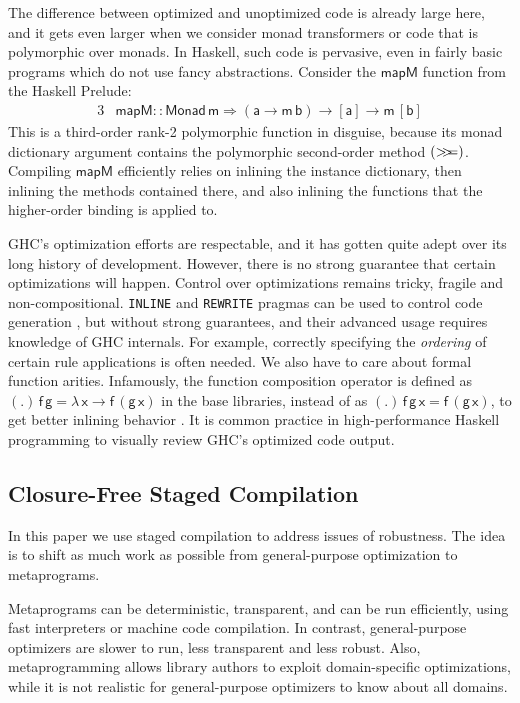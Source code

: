 \documentclass[acmsmall,screen]{acmart}
\newcommand{\msf}[1]{{\mathsf{#1}}}
\newcommand{\lam}{\lambda\,}
\newcommand{\vm}{\mathsf{m}}
\newcommand{\va}{\mathsf{a}}
\newcommand{\vb}{\mathsf{b}}
\newcommand{\vx}{\mathsf{x}}
\newcommand{\vf}{\mathsf{f}}
\newcommand{\vg}{\mathsf{g}}
\newcommand{\Monad}{\msf{Monad}}
\newcommand{\bind}{\mathbin{>\!\!>\mkern-6.7mu=}}
\theoremstyle{remark}
\begin{document}
The difference between optimized and unoptimized code is already large here, and
it gets even larger when we consider monad transformers or code that is
polymorphic over monads. In Haskell, such code is pervasive, even in fairly
basic programs which do not use fancy abstractions. Consider the $\msf{mapM}$
function from the Haskell Prelude:
\begin{alignat*}{3}
  & \msf{mapM} :: \Monad\,\vm \Rightarrow (\va \to \vm\,\vb) \to [\va] \to \vm\,[\vb]
\end{alignat*}
This is a third-order rank-2 polymorphic function in disguise, because
its monad dictionary argument contains the polymorphic second-order method
$(\bind)$.  Compiling $\msf{mapM}$ efficiently relies on inlining the instance
dictionary, then inlining the methods contained there, and also inlining the
functions that the higher-order binding is applied to.

GHC's optimization efforts are respectable, and it has gotten quite adept over
its long history of development. However, there is no strong guarantee that
certain optimizations will happen. Control over optimizations remains tricky,
fragile and non-compositional. \texttt{INLINE} and \texttt{REWRITE} pragmas can
be used to control code generation \cite{ghcdocs}, but without strong
guarantees, and their advanced usage requires knowledge of GHC internals. For
example, correctly specifying the \emph{ordering} of certain rule applications
is often needed. We also have to care about formal function arities. Infamously,
the function composition operator is defined as $(.)\,\vf\,\vg = \lam \vx \to
\vf\,(\vg\,\vx)$ in the base libraries, instead of as $(.)\,\vf\,\vg\,\vx =
\vf\,(\vg\,\vx)$, to get better inlining behavior \cite{ghcbase}. It is common
practice in high-performance Haskell programming to visually review GHC's
optimized code output.

\subsection{Closure-Free Staged Compilation}

In this paper we use staged compilation to address issues of robustness. The
idea is to shift as much work as possible from general-purpose optimization to
metaprograms.

Metaprograms can be deterministic, transparent, and can be run efficiently,
using fast interpreters or machine code compilation. In contrast,
general-purpose optimizers are slower to run, less transparent and less
robust. Also, metaprogramming allows library authors to exploit
domain-specific optimizations, while it is not realistic for general-purpose
optimizers to know about all domains.
\end{document}
